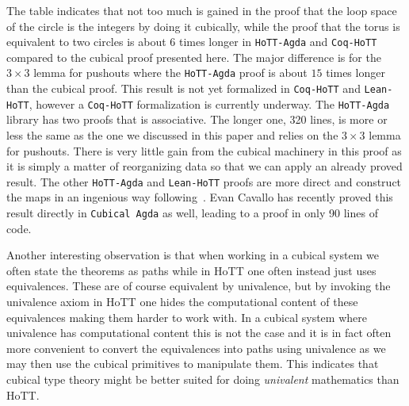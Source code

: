 The table indicates that not too much is gained in the proof that the
loop space of the circle is the integers by doing it cubically, while
the proof that the torus is equivalent to two circles is about $6$
times longer in \texttt{HoTT-Agda} and \texttt{Coq-HoTT} compared to the cubical proof
presented here. The major difference is for the $3 \times 3$ lemma for
pushouts where the \texttt{HoTT-Agda} proof is about $15$ times longer than the
cubical proof. This result is not yet formalized in \texttt{Coq-HoTT} and
\texttt{Lean-HoTT}, however a \texttt{Coq-HoTT} formalization is currently underway. The
\texttt{HoTT-Agda} library has two proofs that  is associative. The
longer one, 320 lines, is more or less the same as the one we
discussed in this paper and relies on the $3 \times 3$ lemma for
pushouts. There is very little gain from the cubical machinery in this
proof as it is simply a matter of reorganizing data so that we can
apply an already proved result. The other \texttt{HoTT-Agda} and \texttt{Lean-HoTT}
proofs are more direct and construct the maps in an ingenious way
following~. Evan Cavallo has recently
proved this result directly in \texttt{Cubical Agda} as well, leading to a
proof in only 90 lines of code.

Another interesting observation is that when working in a cubical
system we often state the theorems as paths while in HoTT one often
instead just uses equivalences. These are of course equivalent by
univalence, but by invoking the univalence axiom in HoTT one hides the
computational content of these equivalences making them harder to work
with. In a cubical system where univalence has computational content
this is not the case and it is in fact often more convenient to
convert the equivalences into paths using univalence as we may then
use the cubical primitives to manipulate them. This indicates that
cubical type theory might be better suited for doing \emph{univalent}
mathematics than HoTT.

